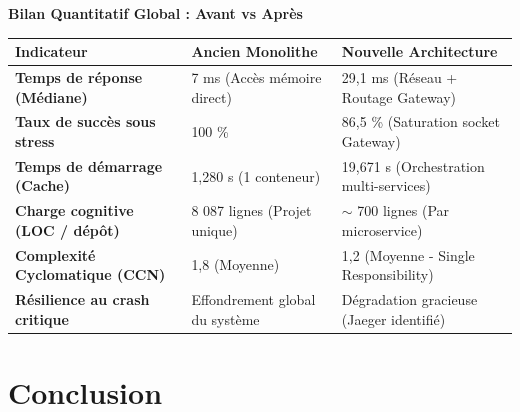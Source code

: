 \documentclass[10pt,aspectratio=169]{beamer}
\begin{document}
\begin{frame}{\textbf{Bilan Quantitatif Global : Avant vs Après}}
    \renewcommand{\arraystretch}{1.2}
    \small
    \begin{tabularx}{\textwidth}{p{3.8cm} p{5.0cm} p{5.0cm}}
        \toprule
        \textbf{Indicateur} & \textbf{Ancien Monolithe} & \textbf{Nouvelle Architecture} \\
        \midrule
        \textbf{Temps de réponse (Médiane)} & 7 ms (Accès mémoire direct) & 29,1 ms (Réseau + Routage Gateway) \\
        \textbf{Taux de succès sous stress} & 100 \% & 86,5 \% (Saturation socket Gateway) \\
        \textbf{Temps de démarrage (Cache)} & 1,280 s (1 conteneur) & 19,671 s (Orchestration multi-services) \\
        \textbf{Charge cognitive (LOC / dépôt)} & 8 087 lignes (Projet unique) & $\sim$ 700 lignes (Par microservice) \\
        \textbf{Complexité Cyclomatique (CCN)} & 1,8 (Moyenne) & 1,2 (Moyenne - Single Responsibility) \\
        \textbf{Résilience au crash critique} & Effondrement global du système & Dégradation gracieuse (Jaeger identifié) \\
        \bottomrule
    \end{tabularx}
\end{frame}

\section{Conclusion}
\end{document}
